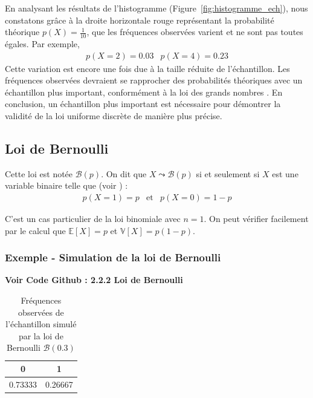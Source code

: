   En analysant les résultats de l'histogramme (Figure~\ref{fig:histogramme_ech}), nous constatons grâce à la droite horizontale rouge représentant la probabilité théorique $p(X)=\frac{1}{10}$, que les fréquences observées varient et ne sont pas toutes égales. Par exemple, 
  \[
    \begin{array}{cc}
      p(X=2) = 0.03 & p(X=4) = 0.23
    \end{array}
  \]
  Cette variation est encore une fois due à la taille réduite de l'échantillon. Les fréquences observées devraient se rapprocher des probabilités théoriques avec un échantillon plus important, conformément à la loi des grands nombres \cite{lawoflargeNumbers}. 
  En conclusion, un échantillon plus important est nécessaire pour démontrer la validité de la loi uniforme discrète de manière plus précise.

\subsection{Loi de Bernoulli}
  Cette loi est notée $\mathcal B(p)$. On dit que $X\leadsto \mathcal B(p)$ si et seulement si $X$ est une variable binaire telle que (voir \cite{bernoulliLaw}) :
  \begin{equation}
    \begin{array}{ccc}
      p(X=1) = p & \text{et} & p(X=0) = 1-p
    \end{array}
  \end{equation}  

  C’est un cas particulier de la loi binomiale avec $n=1$. On peut vérifier facilement par le calcul que $\mathbb E[X]=p$ et $\mathbb V[X]=p(1-p)$.

\subsubsection{Exemple - Simulation de la loi de Bernoulli}

\textbf{Voir Code Github \cite{git} : 2.2.2 Loi de Bernoulli}

\begin{table}[H]
  \centering
  \begin{tabular}{c c}
    \toprule
    0 & 1 \\
    \midrule
    0.73333 & 0.26667 \\
    \bottomrule
  \end{tabular}
  \caption{Fréquences observées de l'échantillon simulé par la loi de Bernoulli $\mathcal B(0.3)$}
  \label{tab:bernoulli}
\end{table}


